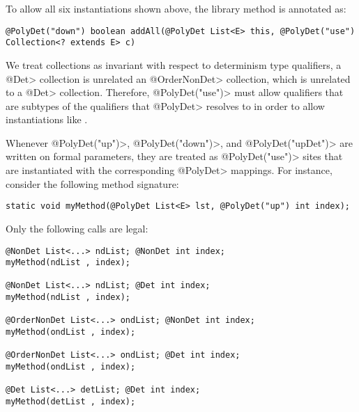 To allow all six instantiations shown above, the library method
is annotated as:

\begin{Verbatim}
@PolyDet("down") boolean addAll(@PolyDet List<E> this, @PolyDet("use") Collection<? extends E> c)
\end{Verbatim}
We treat collections as invariant with respect to determinism type qualifiers,
a \<@Det> collection is unrelated an \<@OrderNonDet> collection, which is unrelated
to a \<@Det> collection. Therefore, \<@PolyDet("use")> must allow qualifiers that
are subtypes of the qualifiers that \<@PolyDet> resolves to in order to allow
instantiations like .

Whenever \<@PolyDet("up")>, \<@PolyDet("down")>, and \<@PolyDet("upDet")> are written on formal parameters,
they are treated as \<@PolyDet("use")> sites that are instantiated with the corresponding \<@PolyDet> mappings.
For instance, consider the following method signature:
\begin{Verbatim}
static void myMethod(@PolyDet List<E> lst, @PolyDet("up") int index);
\end{Verbatim}
Only the following calls are legal:
\begin{Verbatim}
@NonDet List<...> ndList; @NonDet int index;
myMethod(ndList , index);

@NonDet List<...> ndList; @Det int index;
myMethod(ndList , index);

@OrderNonDet List<...> ondList; @NonDet int index;
myMethod(ondList , index);

@OrderNonDet List<...> ondList; @Det int index;
myMethod(ondList , index);

@Det List<...> detList; @Det int index;
myMethod(detList , index);
\end{Verbatim}

